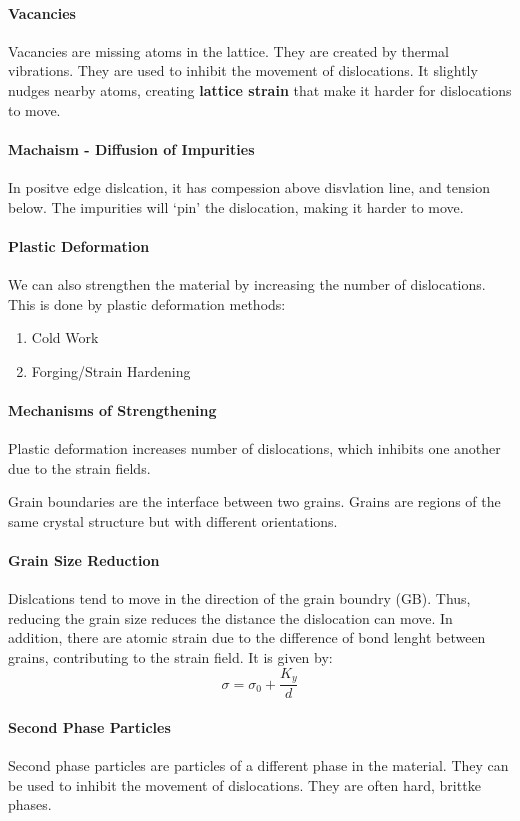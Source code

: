 \documentclass[11pt]{article}
\begin{document}
\paragraph{Vacancies} Vacancies are missing atoms in the lattice. They are created by thermal vibrations. They are used to inhibit the movement of dislocations.
It slightly nudges nearby atoms, creating \textbf{lattice strain} that make it harder for dislocations to move.
\paragraph{Machaism - Diffusion of Impurities} In positve edge dislcation, it has compession above disvlation line, and tension below. The impurities will `pin' the dislocation, making it harder to move.
\paragraph{Plastic Deformation} We can also strengthen the material by increasing the number of dislocations. This is done by plastic deformation methods:
\begin{enumerate}
    \item Cold Work
    \item Forging/Strain Hardening
\end{enumerate}
\paragraph{Mechanisms of Strengthening} Plastic deformation increases number of dislocations, which inhibits one another due to the strain fields.
\begin{definition}
    Grain boundaries are the interface between two grains. Grains are regions of the same crystal structure but with different orientations.
\end{definition}
\paragraph{Grain Size Reduction} Dislcations tend to move in the direction of the grain boundry (GB). Thus, reducing the grain size reduces the distance the dislocation can move. In addition, there are atomic strain due to the difference of bond lenght between grains, contributing to the strain field. It is given by:
\begin{equation}
    \sigma = \sigma_0 + \frac{K_y}{d}
\end{equation}
\paragraph{Second Phase Particles} Second phase particles are particles of a different phase in the material. They can be used to inhibit the movement of dislocations. They are often hard, brittke phases.
\end{document}
